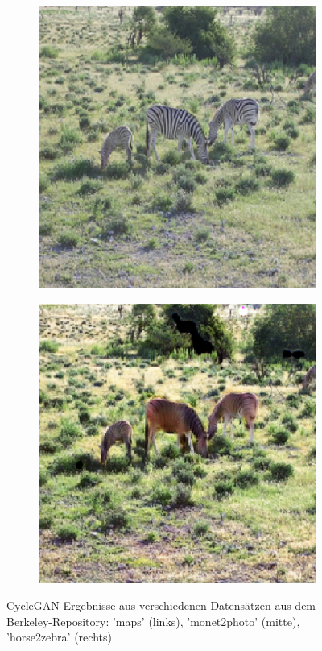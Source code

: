 \begin{figure}
\begin{subfigure}[t]{.14\textwidth}
  \end{subfigure}
  \hfill
  \begin{subfigure}[t]{.14\textwidth}
    \centering
    \includegraphics[width=\linewidth]{images/cycleGanResults/zebra_input2.png}
  \end{subfigure}
  \begin{subfigure}[t]{.14\textwidth}
    \centering
    \includegraphics[width=\linewidth]{images/cycleGanResults/zebra_output2.png}
  \end{subfigure}
  \caption{CycleGAN-Ergebnisse aus verschiedenen Datensätzen aus dem Berkeley-Repository: 'maps' (links), 'monet2photo' (mitte), 'horse2zebra' (rechts)}

\end{figure}


